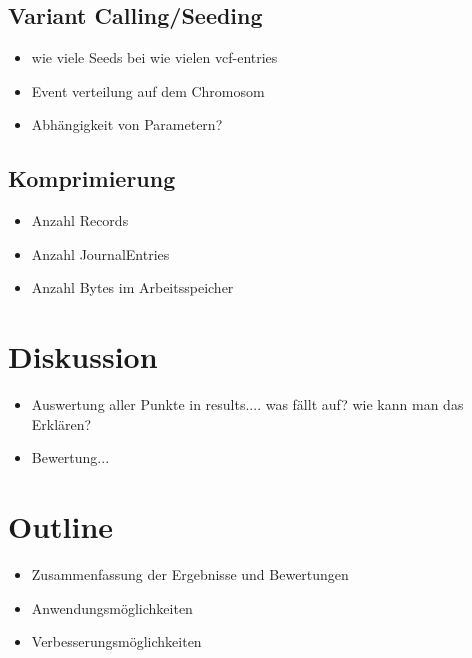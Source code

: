 \documentclass[11pt]{article}
\begin{document}
\subsection{Variant Calling/Seeding}
\begin{itemize}
\item wie viele Seeds bei wie vielen vcf-entries
\item Event verteilung auf dem Chromosom
\item Abhängigkeit von Parametern?
\end{itemize}

\subsection{Komprimierung}
\begin{itemize}
\item Anzahl Records
\item Anzahl JournalEntries
\item Anzahl Bytes im Arbeitsspeicher
\end{itemize}

\section{Diskussion}
\begin{itemize}
\item Auswertung aller Punkte in results.... was fällt auf? wie kann man das Erklären? 
\item Bewertung...
\end{itemize}

\section{Outline}
\begin{itemize}
\item Zusammenfassung der Ergebnisse und Bewertungen
\item Anwendungsmöglichkeiten
\item Verbesserungsmöglichkeiten
\end{itemize}
\end{document}
